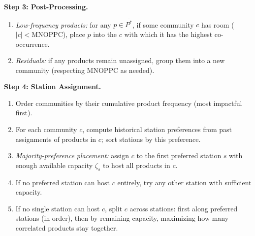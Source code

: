 \documentclass[preprint,review,11pt,authoryear]{elsarticle}
\begin{document}
\begin{algorithm}[H]
\begin{algorithmic}[1]
\ContinuedFloat                %
\caption{Greedy Product Clustering and Station Assignment (continued)}
\Statex
\textbf{Step 3: Post-Processing.}
\begin{enumerate}[label=(\alph*)]
\item \emph{Low-frequency products:} for any $p\in \overline{P^*}$, if some community $c$ has room ($|c|<\mathrm{MNOPPC}$), place $p$ into the $c$ with which it has the highest co-occurrence.
\item \emph{Residuals:} if any products remain unassigned, group them into a new community (respecting $\mathrm{MNOPPC}$ as needed).
\end{enumerate}
\medskip
\textbf{Step 4: Station Assignment.}
\begin{enumerate}[label=(\alph*)]
\item Order communities by their cumulative product frequency (most impactful first).
\item For each community $c$, compute historical station preferences from past assignments of products in $c$; sort stations by this preference.
\item \emph{Majority-preference placement:} assign $c$ to the first preferred station $s$ with enough available capacity $\zeta_s$ to host all products in $c$.
\item If no preferred station can host $c$ entirely, try any other station with sufficient capacity.
\item If no single station can host $c$, split $c$ across stations: first along preferred stations (in order), then by remaining capacity, maximizing how many correlated products stay together.
\end{enumerate}
\end{algorithmic}
\end{algorithm}
\end{document}
